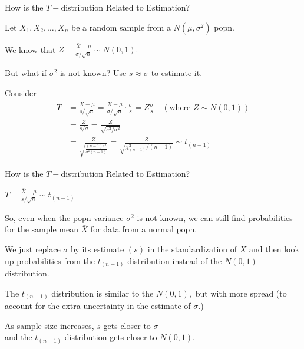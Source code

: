 \documentclass{beamer}\usepackage[]{graphicx}\usepackage[]{color}
\begin{document}
\begin{frame}{How is the $T-$distribution Related to Estimation?}

Let $X_1,X_2,\ldots,X_n$ be a random sample 
from a $N(\mu,\sigma^2)$ popn.
\medskip

We know that $\displaystyle Z=\frac{\bar{X}-\mu}{\sigma/\sqrt{n}}\sim N(0,1).$ \pause
\medskip

But what if $\sigma^2$ is not known? \pause
Use $s\approx\sigma$ to estimate it.
\bigskip

Consider
\begin{align*}
T &= \frac{\bar{X}-\mu}{s/\sqrt{n}} 
= \frac{\bar{X}-\mu}{\sigma/\sqrt{n}} \cdot \frac{\sigma}{s}
= Z \frac{\sigma}{s} \quad
 (\mbox{where\ } Z\sim N(0,1) )\\
&= \frac{Z}{s/\sigma} = \frac{Z}{\sqrt{s^2/\sigma^2}}\\
&= \frac{Z}{\sqrt{\frac{(n-1)s^2}{\sigma^2(n-1)}}}
 = \frac{Z}{\sqrt{\chi^2_{(n-1)}/(n-1)}}
\sim t_{(n-1)}
\end{align*}
\pause

\end{frame}

\begin{frame}{How is the $T-$distribution Related to Estimation?}

$T = \frac{\bar{X}-\mu}{s/\sqrt{n}} \sim t_{(n-1)}$ \pause

\bigskip

So, even when the popn variance $\sigma^2$ is not known, we can
still find probabilities for the sample mean $\bar{X}$ for data from a
normal popn. \pause  
\medskip

We just replace $\sigma$ by its estimate $(s)$ in the standardization of
$\bar{X}$ and then look up probabilities from the $t_{(n-1)}$ distribution
instead of the $N(0,1)$ distribution. \pause
\bigskip

The $t_{(n-1)}$ distribution is similar to the $N(0,1),$ but with more
spread (to account for the extra uncertainty in the estimate of $\sigma$.)
\medskip \pause

As sample size increases, $s$ gets closer to $\sigma$ \\
and the $t_{(n-1)}$ distribution gets closer to $N(0,1).$ \pause

\end{frame}
\end{document}
